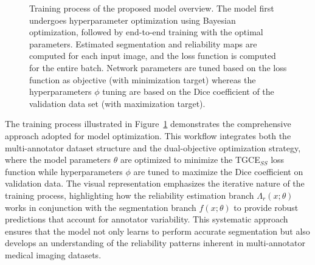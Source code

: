\begin{figure}[H]
\begin{tikzpicture}
  \end{tikzpicture}
  \caption{Training process of the proposed model overview. The model first
    undergoes hyperparameter optimization using Bayesian optimization,
    followed by end-to-end training with the optimal parameters.
    Estimated segmentation and reliability maps are computed for each input
    image, and the loss function is computed for the entire batch.
    Network parameters are tuned based on the loss function as
    objective (with minimization target) whereas the hyperparameters
    $\phi$ tuning are based on the Dice coefficient of the validation
  data set (with maximization target). }
  \label{fig:optimization_process}
\end{figure}

The training process illustrated in
Figure~\ref{fig:optimization_process} demonstrates the comprehensive
approach adopted for model optimization. This workflow integrates
both the multi-annotator dataset structure and the dual-objective
optimization strategy, where the model parameters $\theta$ are
optimized to minimize the TGCE$_{SS}$ loss function while
hyperparameters $\phi$ are tuned to maximize the Dice coefficient on
validation data. The visual representation emphasizes the iterative
nature of the training process, highlighting how the reliability
estimation branch $\Lambda_r(x; \theta)$ works in conjunction with
the segmentation branch $f(x; \theta)$ to provide robust predictions
that account for annotator variability. This systematic approach
ensures that the model not only learns to perform accurate
segmentation but also develops an understanding of the reliability
patterns inherent in multi-annotator medical imaging datasets.